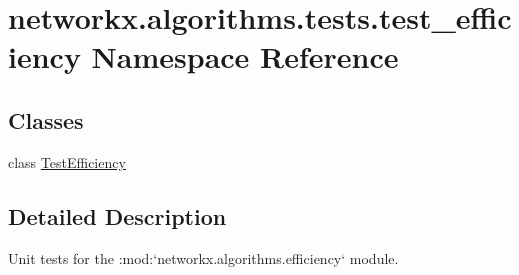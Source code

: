 \hypertarget{namespacenetworkx_1_1algorithms_1_1tests_1_1test__efficiency}{}\section{networkx.\+algorithms.\+tests.\+test\+\_\+efficiency Namespace Reference}
\label{namespacenetworkx_1_1algorithms_1_1tests_1_1test__efficiency}
\subsection*{Classes}
\begin{DoxyCompactItemize}
\item 
class \hyperlink{classnetworkx_1_1algorithms_1_1tests_1_1test__efficiency_1_1TestEfficiency}{Test\+Efficiency}
\end{DoxyCompactItemize}


\subsection{Detailed Description}
\begin{DoxyVerb}Unit tests for the :mod:`networkx.algorithms.efficiency` module.\end{DoxyVerb}
 